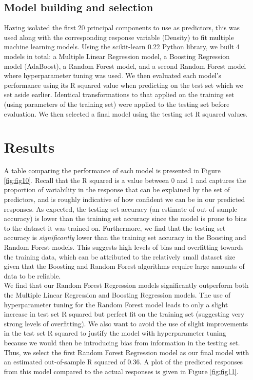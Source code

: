 \documentclass[a4paper]{article}
\begin{document}
\subsection{Model building and selection}

Having isolated the first 20 principal components to use as predictors, this was used along with the corresponding response variable (Density) to fit multiple machine learning models. Using the scikit-learn 0.22 Python library, we built 4 models in total: a Multiple Linear Regression model, a Boosting Regression model (AdaBoost), a Random Forest model, and a second Random Forest model where hyperparameter tuning was used. We then evaluated each model's performance using its R squared value when predicting on the test set which we set aside earlier. Identical transformations to that applied on the training set (using parameters of the training set) were applied to the testing set before evaluation. We then selected a final model using the testing set R squared values.

\section{Results}

A table comparing the performance of each model is presented in Figure \ref{fig:fig10}. Recall that the R squared is a value between 0 and 1 and captures the proportion of variability in the response that can be explained by the set of predictors, and is roughly indicative of how confident we can be in our predicted responses. As expected, the testing set accuracy (an estimate of out-of-sample accuracy) is lower than the training set accuracy since the model is prone to bias to the dataset it was trained on. Furthermore, we find that the testing set accuracy is \textit{significantly} lower than the training set accuracy in the Boosting and Random Forest models. This suggests high levels of bias and overfitting towards the training data, which can be attributed to the relatively small dataset size given that the Boosting and Random Forest algorithms require large amounts of data to be reliable. \\

We find that our Random Forest Regression models significantly outperform both the Multiple Linear Regression and Boosting Regression models. The use of hyperparameter tuning for the Random Forest model leads to only a slight increase in test set R squared but perfect fit on the training set (suggesting very strong levels of overfitting). We also want to avoid the use of slight improvements in the test set R squared to justify the model with hyperparameter tuning because we would then be introducing bias from information in the testing set. Thus, we select the first Random Forest Regression model as our final model with an estimated out-of-sample R squared of 0.36. A plot of the predicted responses from this model compared to the actual responses is given in Figure \ref{fig:fig11}.
\end{document}

